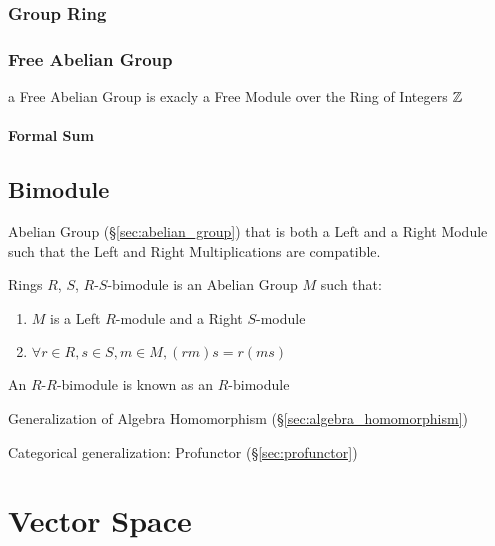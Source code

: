 \subsubsection{Group Ring}\label{sec:group_ring}

\subsubsection{Free Abelian Group}\label{sec:free_abelian_group}

a Free Abelian Group is exacly a Free Module over the Ring of Integers $\mathbb{Z}$



\paragraph{Formal Sum}\label{sec:formal_sum}\hfill



\subsection{Bimodule}\label{sec:bimodule}

Abelian Group (\S\ref{sec:abelian_group}) that is both a Left and a
Right Module such that the Left and Right Multiplications are
compatible.

Rings $R$, $S$, $R$-$S$-bimodule is an Abelian Group $M$ such that:

\begin{enumerate}
\item $M$ is a Left $R$-module and a Right $S$-module
\item $\forall r \in R, s \in S, m \in M, (rm)s = r(ms)$
\end{enumerate}

An $R$-$R$-bimodule is known as an $R$-bimodule

Generalization of Algebra Homomorphism
(\S\ref{sec:algebra_homomorphism})

Categorical generalization: Profunctor (\S\ref{sec:profunctor})



\section{Vector Space}\label{sec:vector_space}

